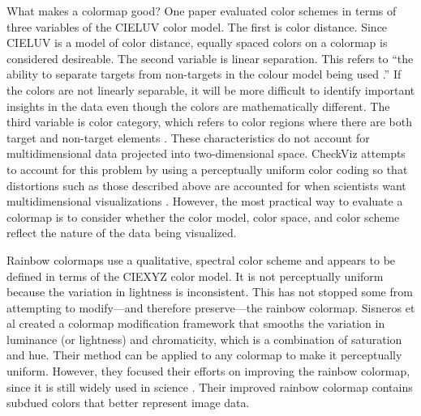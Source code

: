 \documentclass[journal,12pt]{IEEEtran}
\begin{document}
What makes a colormap good?
One paper evaluated color schemes in terms of
three variables of the CIELUV color model. The first
is color distance. Since CIELUV is a model of color distance,
equally spaced colors on a colormap is considered desireable. The second variable is linear separation.
This refers to “the ability to separate targets
from non-targets in the colour model being
used \cite{colorchoice}.” If the
colors are not linearly separable, it
will be more difficult to identify important insights in the data even though the
colors are mathematically different. The third variable
is color category, which refers to color regions where
there are both target and non-target elements \cite{colorchoice}.
These characteristics do not account for multidimensional data projected into two-dimensional
space. CheckViz attempts to account for this problem
by using a perceptually uniform color coding so that
distortions such as those described above are accounted for when 
scientists want multidimensional visualizations \cite{checkviz}.
However, the most practical way to evaluate a colormap is to consider whether the color
model, color space, and color scheme reflect the nature of the data being visualized.

Rainbow colormaps use a qualitative, spectral color scheme and appears to be defined
in terms of the CIEXYZ color model. It is not perceptually uniform because
the variation in lightness is inconsistent.
This has not stopped some from attempting to modify---and therefore preserve---the
rainbow colormap.
Sisneros et al created a colormap modification framework that smooths the variation
in luminance (or lightness) and chromaticity, which is a combination of saturation
and hue. Their method can be applied to any colormap to make it perceptually uniform.
However, they focused their efforts on improving the rainbow colormap, since it is still widely
used in science \cite{chasingrainbows}. Their improved rainbow colormap contains subdued colors that better
represent image data. 
\end{document}

